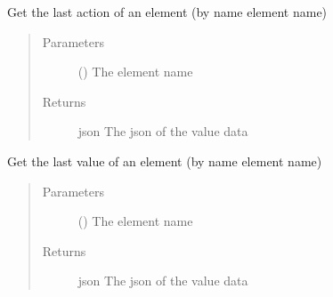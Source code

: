 \documentclass[letterpaper,10pt,english]{sphinxmanual}
\begin{document}
\begin{fulllineitems}
\begin{fulllineitems}
\label{\detokenize{index:Api.Api.get_last_action_by_element_name}}
\sphinxAtStartPar
Get the last action of an element (by name element name)
\begin{quote}\begin{description}
\item[{Parameters}] \leavevmode
\sphinxAtStartPar
{} () \textendash{} The element name

\item[{Returns}] \leavevmode
\sphinxAtStartPar
json \textendash{} The json of the value data

\end{description}\end{quote}

\end{fulllineitems}


\begin{fulllineitems}
\label{\detokenize{index:Api.Api.get_last_value_by_element_name}}
\sphinxAtStartPar
Get the last value of an element (by name element name)
\begin{quote}\begin{description}
\item[{Parameters}] \leavevmode
\sphinxAtStartPar
{} () \textendash{} The element name

\item[{Returns}] \leavevmode
\sphinxAtStartPar
json \textendash{} The json of the value data

\end{description}\end{quote}

\end{fulllineitems}


\end{fulllineitems}
\end{document}
